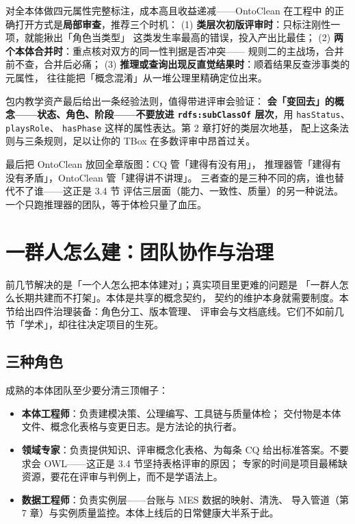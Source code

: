 对全本体做四元属性完整标注，成本高且收益递减——OntoClean 在工程中
的正确打开方式是\textbf{局部审查}，推荐三个时机：
(1) \textbf{类层次初版评审时}：只标注刚性一项，就能揪出「角色当类型」
这类发生率最高的错误，投入产出比最佳；
(2) \textbf{两个本体合并时}：重点核对双方的同一性判据是否冲突——
规则二的主战场，合并前不查，合并后必痛；
(3) \textbf{推理或查询出现反直觉结果时}：顺着结果反查涉事类的元属性，
往往能把「概念混淆」从一堆公理里精确定位出来。

包内教学资产最后给出一条经验法则，值得带进评审会验证：
\textbf{会「变回去」的概念——状态、角色、阶段——不要放进
\texttt{rdfs:subClassOf} 层次}，用 \texttt{hasStatus}、\texttt{playsRole}、
\texttt{hasPhase} 这样的属性表达。第 2 章打好的类层次地基，
配上这条法则与三条规则，足以让你的 TBox 在多数评审中昂首过关。

最后把 OntoClean 放回全章版图：CQ 管「建得有没有用」，
推理器管「建得有没有矛盾」，OntoClean 管「建得讲不讲理」。
三者查的是三种不同的病，谁也替代不了谁——这正是 3.4 节
评估三层面（能力、一致性、质量）的另一种说法。
一个只跑推理器的团队，等于体检只量了血压。

\section{一群人怎么建：团队协作与治理}

前几节解决的是「一个人怎么把本体建对」；真实项目里更难的问题是
「一群人怎么长期共建而不打架」。本体是共享的概念契约，
契约的维护本身就需要制度。本节给出四件治理装备：角色分工、版本管理、
评审会与文档底线。它们不如前几节「学术」，却往往决定项目的生死。

\subsection{三种角色}

成熟的本体团队至少要分清三顶帽子：

\begin{itemize}
  \item \textbf{本体工程师}：负责建模决策、公理编写、工具链与质量体检；
        交付物是本体文件、概念化表格与变更日志。是方法论的执行者。
  \item \textbf{领域专家}：负责提供知识、评审概念化表格、为每条 CQ
        给出标准答案。不要求会 OWL——这正是 3.4 节坚持表格评审的原因；
        专家的时间是项目最稀缺资源，要花在评审与判例上，而不是学语法上。
  \item \textbf{数据工程师}：负责实例层——台账与 MES 数据的映射、清洗、
        导入管道（第 7 章）与实例质量监控。本体上线后的日常健康大半系于此。
\end{itemize}

